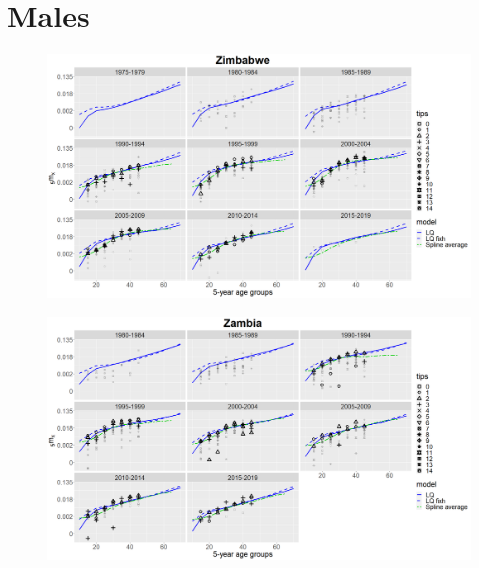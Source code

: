 \documentclass[12pt,a4paper]{article}
\begin{document}
\section*{\centering Males}
\begin{figure}[H]
\includegraphics[width = \linewidth]{Burkina Faso/8/zimbabwe males.png}
\end{figure}
\begin{figure}[H]
\includegraphics[width = \linewidth]{Burkina Faso/8/zambia males.png}
\end{figure}



\newpage
\end{document}
